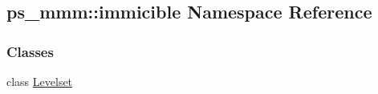 \hypertarget{namespaceps__mmm_1_1immicible}{}\subsection{ps\+\_\+mmm\+:\+:immicible Namespace Reference}
\label{namespaceps__mmm_1_1immicible}
\subsubsection*{Classes}
\begin{DoxyCompactItemize}
\item 
class \hyperlink{classps__mmm_1_1immicible_1_1_levelset}{Levelset}
\end{DoxyCompactItemize}
